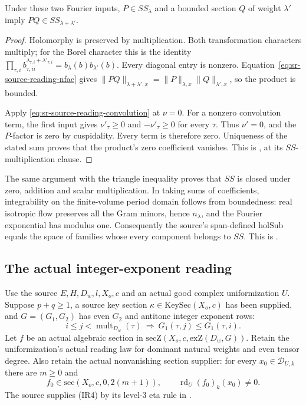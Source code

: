 \begin{srlemma}\label{lem:sr-source-bdd-cusp-product}
Under these two Fourier inputs, \(P\in SS_\lambda\) and a bounded
section \(Q\) of weight \(\lambda'\) imply \(PQ\in SS_{\lambda+\lambda'}\).
\end{srlemma}
\begin{proof}
Holomorphy is preserved by multiplication.
Both transformation characters multiply; for the Borel character
this is the identity
\(\prod_{\tau,i}b_{\tau,ii}^{\lambda_{\tau,i}+\lambda'_{\tau,i}}
 =b_\lambda(b)b_{\lambda'}(b)\).
Every diagonal entry is nonzero.
Equation~\eqref{eq:sr-source-reading-nfac} gives
\(\|PQ\|_{\lambda+\lambda',x}
 =\|P\|_{\lambda,x}\|Q\|_{\lambda',x}\), so the product is bounded.

Apply \eqref{eq:sr-source-reading-convolution} at \(\nu=0\).
For a nonzero convolution term, the first input gives
\(\nu'_\tau\ge0\) and \(-\nu'_\tau\ge0\) for every \(\tau\).
Thus \(\nu'=0\), and the \(P\)-factor is zero by cuspidality.
Every term is therefore zero.
Uniqueness of the stated sum proves that the product's zero
coefficient vanishes. This is
, at its
\(SS\)-multiplication clause.
\end{proof}
The same argument with the triangle inequality proves that \(SS\)
is closed under zero, addition and scalar multiplication.
In taking sums of coefficients, integrability on the finite-volume
period domain follows from boundedness: real isotropic flow
preserves all the Gram minors, hence \(n_\lambda\), and the
Fourier exponential has modulus one.
Consequently the source's span-defined \(\mathrm{holSub}\) equals
the space of families whose every component belongs to \(SS\).
This is .

\subsection{The actual integer-exponent reading}
Use the source \(E,H,D_w,l,X_o,c\) and an actual good complex
uniformization \(U\).
Suppose \(p+q\ge1\), a source key section
\(\kappa\in\mathrm{KeySec}(X_o,c)\) has been supplied, and
\(G=(G_1,G_2)\) has even \(G_2\) and antitone integer exponent
rows:
\[
 i\le j<\operatorname{mult}_{D_w}(\tau)
 \ \Longrightarrow\ G_1(\tau,j)\le G_1(\tau,i).
 \tag{IR3}\label{eq:sr-source-integer-antitone}
\]
Let \(f\) be an actual algebraic section in
\(\mathrm{secZ}(X_o,c,\mathrm{exZ}(D_w,G))\).
Retain the uniformization's actual reading law for dominant
natural weights and even tensor degree.
Also retain the actual nonvanishing section supplier:
for every \(x_0\in\mathcal D_{U,k}\) there are \(m\ge0\) and
\[
 f_0\in\mathrm{sec}(X_o,c,0,2(m+1)),\qquad
             \operatorname{rd}_U(f_0)_k(x_0)\ne0.
 \tag{IR4}\label{eq:sr-source-reading-nonvanishing}
\]
The source supplies (IR4) by its level-\(3\) eta rule in
.

